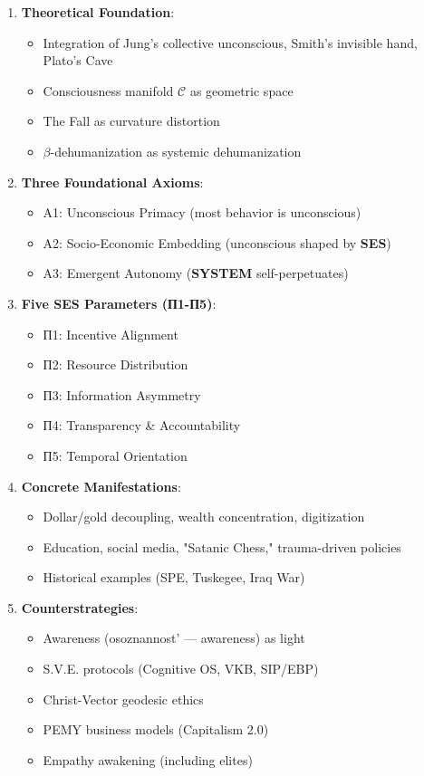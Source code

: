 \documentclass[11pt,a4paper]{article}
\newcommand{\SYSTEM}{\textbf{SYSTEM}}
\newcommand{\SES}{\textbf{SES}}
\newcommand{\betaDehum}{$\beta$-dehumanization}
\newcommand{\CC}{$\mathcal{C}$}
\theoremstyle{definition}
\theoremstyle{remark}
\begin{document}
\begin{enumerate}
\item \textbf{Theoretical Foundation}:
\begin{itemize}
\item Integration of Jung's collective unconscious, Smith's invisible hand, Plato's Cave
\item Consciousness manifold \CC{} as geometric space
\item The Fall as curvature distortion
\item \betaDehum{} as systemic dehumanization
\end{itemize}

\item \textbf{Three Foundational Axioms}:
\begin{itemize}
\item A1: Unconscious Primacy (most behavior is unconscious)
\item A2: Socio-Economic Embedding (unconscious shaped by \SES{})
\item A3: Emergent Autonomy (\SYSTEM{} self-perpetuates)
\end{itemize}

\item \textbf{Five SES Parameters (П1-П5)}:
\begin{itemize}
\item П1: Incentive Alignment
\item П2: Resource Distribution
\item П3: Information Asymmetry
\item П4: Transparency \& Accountability
\item П5: Temporal Orientation
\end{itemize}

\item \textbf{Concrete Manifestations}:
\begin{itemize}
\item Dollar/gold decoupling, wealth concentration, digitization
\item Education, social media, "Satanic Chess," trauma-driven policies
\item Historical examples (SPE, Tuskegee, Iraq War)
\end{itemize}

\item \textbf{Counterstrategies}:
\begin{itemize}
\item Awareness (osoznannost' — awareness) as light
\item S.V.E. protocols (Cognitive OS, VKB, SIP/EBP)
\item Christ-Vector geodesic ethics
\item PEMY business models (Capitalism 2.0)
\item Empathy awakening (including elites)
\end{itemize}
\end{enumerate}
\end{document}
